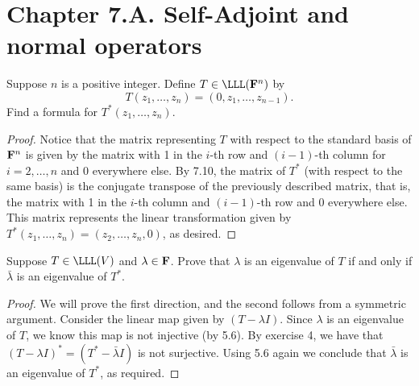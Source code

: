 \section*{Chapter 7.A. Self-Adjoint and normal operators}


\begin{exercise}{1}
  Suppose $n$ is a positive integer. Define $T\in\LLL(\bF^n)$ by 
  \[T(z_1,\dots,z_n)=(0,z_1,\dots,z_{n-1}).\]
  Find a formula for $T^\ast(z_1,\dots,z_n)$.
\end{exercise}
\begin{proof}
 Notice that the matrix representing $T$ with respect to the standard basis of $\mathbf{F}^n$ is given by the matrix with 1 in the $i$-th row and $(i-1)$-th column for $i=2,\dots,n$ and 0 everywhere else. By 7.10, the matrix of $T^\ast$ (with respect to the same basis) is the conjugate transpose of the previously described matrix, that is, the matrix with 1 in the $i$-th column and $(i-1)$-th row and 0 everywhere else. This matrix represents the linear transformation given by $T^\ast(z_1,\dots,z_n)=(z_2,\dots,z_{n},0)$, as desired.
\end{proof}

\begin{exercise}{2}
  Suppose $T\in\LLL(V)$ and $\lambda\in\mathbf{F}$. Prove that $\lambda$ is an eigenvalue of $T$ if and only if $\bar{\lambda}$ is an eigenvalue of $T^\ast$.
\end{exercise}
\begin{proof}
 We will prove the first direction, and the second follows from a symmetric argument. Consider the linear map given by $(T-\lambda I)$. Since $\lambda$ is an eigenvalue of $T$, we know this map is not injective (by 5.6). By exercise 4, we have that $(T-\lambda I)^\ast=(T^\ast-\bar{\lambda}I)$ is not surjective. Using 5.6 again we conclude that $\bar{\lambda}$ is an eigenvalue of $T^\ast$, as required.
\end{proof}


